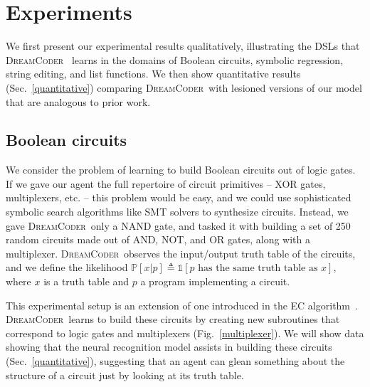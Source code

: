 \documentclass{article}
\newcommand{\system}{\textsc{DreamCoder}~}
\newcommand{\indicator}{\mathds{1}} %
\newcommand{\probability}{\mathds{P}} %
\begin{document}
\section{Experiments}
We first present our experimental results qualitatively,
illustrating the DSLs that  \system
learns in the domains of Boolean circuits, symbolic regression, string editing, and list functions.
We then show quantitative results (Sec.~\ref{quantitative})
comparing \system with lesioned versions
of our model that are analogous to prior work.

\subsection{Boolean circuits}
We consider the problem of learning
to build  Boolean circuits out of logic gates.
If we gave our agent the full repertoire of
circuit primitives -- XOR gates, multiplexers, etc. -- this problem would be easy,
and we could use sophisticated symbolic search algorithms like SMT solvers to synthesize circuits.
Instead, we gave \system only a NAND gate,
and tasked it with building a set of 250 random circuits made out of
AND, NOT, and OR gates, along with a multiplexer.
\system observes the input/output truth table of the circuits,
and we define the likelihood 
$  \probability[x|p]\triangleq\indicator\left[p\text{ has  the same truth table as }x \right]$,
where $x$ is a truth table and $p$ a program implementing a circuit.


This experimental setup is an extension of one introduced in the EC algorithm~\cite{Dechter:2013:BLV:2540128.2540316}.
\system learns to build these
circuits by creating new subroutines that correspond to
logic gates and multiplexers (Fig.~\ref{multiplexer}).
We will show data showing that the neural recognition model
assists in building these circuits (Sec.~\ref{quantitative}),
suggesting that an agent can glean something about the structure of a circuit just by looking at its truth table.
\end{document}
